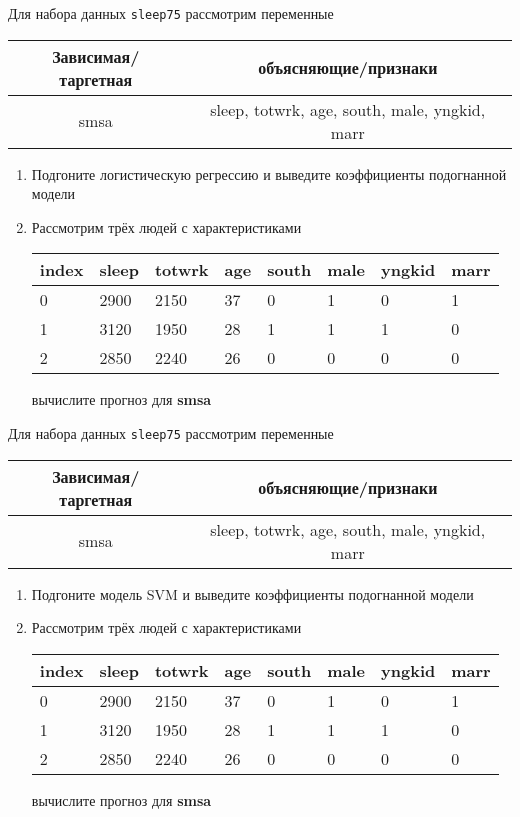 \begin{exercise}
Для набора данных \texttt{sleep75} рассмотрим переменные
\begin{center}
	\begin{tabular}{|c|c|} \hline
		Зависимая/таргетная & объясняющие/признаки \\ \hline
		smsa & sleep, totwrk, age, south, male, yngkid, marr \\ \hline
	\end{tabular}
\end{center}
\begin{enumerate}
	\item Подгоните логистическую регрессию и выведите коэффициенты подогнанной модели
	\item Рассмотрим трёх людей с характеристиками
	\begin{center}
		\begin{tabular}{|l||l|l|l|l|l|l|l|}\hline
			index & sleep & totwrk & age & south & male & yngkid & marr \\ \hline\hline
			0 & 2900 & 2150 & 37 & 0 & 1 &  0 & 1 \\
			1 & 3120 & 1950 & 28 & 1 & 1 &  1 & 0 \\
			2 & 2850 & 2240 & 26 & 0 & 0 &  0 & 0 \\ \hline
		\end{tabular}
	\end{center}
	вычислите прогноз для \textbf{smsa} 
\end{enumerate}
\end{exercise}

\begin{exercise}
Для набора данных \texttt{sleep75} рассмотрим переменные

\begin{center}
	\begin{tabular}{|c|c|} \hline
		Зависимая/таргетная & объясняющие/признаки \\ \hline
		smsa & sleep, totwrk, age, south, male, yngkid, marr \\ \hline
	\end{tabular}
\end{center}

\begin{enumerate}
	\item Подгоните модель SVM и выведите коэффициенты подогнанной модели
	\item Рассмотрим трёх людей с характеристиками
	\begin{center}
		\begin{tabular}{|l||l|l|l|l|l|l|l|}\hline
			index & sleep & totwrk & age & south & male & yngkid & marr \\ \hline\hline
			0 & 2900 & 2150 & 37 & 0 & 1 &  0 & 1 \\
			1 & 3120 & 1950 & 28 & 1 & 1 &  1 & 0 \\
			2 & 2850 & 2240 & 26 & 0 & 0 &  0 & 0 \\ \hline
		\end{tabular}
	\end{center}
	вычислите прогноз для \textbf{smsa} 
\end{enumerate}
\end{exercise}


